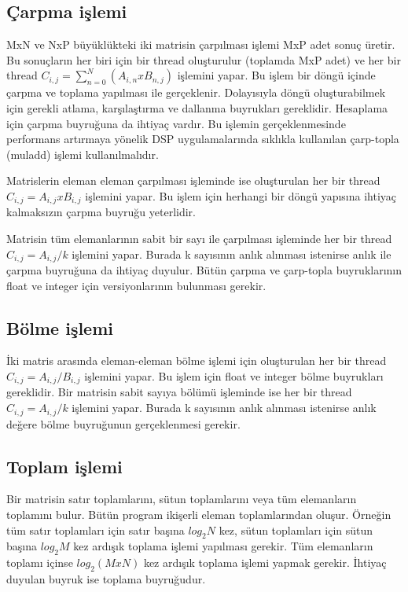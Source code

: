 \subsection{Çarpma işlemi}
MxN ve NxP büyüklükteki iki matrisin çarpılması işlemi MxP adet sonuç üretir. Bu sonuçların her biri için bir thread oluşturulur (toplamda MxP adet) ve her bir thread $C_{i,j} = \sum_{n=0}^{N} (A_{i,n} x B_{n,j})$ işlemini yapar. Bu işlem bir döngü içinde çarpma ve toplama yapılması ile gerçeklenir. Dolayısıyla döngü oluşturabilmek için gerekli atlama, karşılaştırma ve dallanma buyrukları gereklidir. Hesaplama için çarpma buyruğuna da ihtiyaç vardır. Bu işlemin gerçeklenmesinde performans artırmaya yönelik DSP uygulamalarında sıklıkla kullanılan çarp-topla (muladd) işlemi kullanılmalıdır.\par
Matrislerin eleman eleman çarpılması işleminde ise oluşturulan her bir thread $C_{i,j} = A_{i,j} x B_{i,j}$ işlemini yapar. Bu işlem için herhangi bir döngü yapısına ihtiyaç kalmaksızın çarpma buyruğu yeterlidir.\par
Matrisin tüm elemanlarının sabit bir sayı ile çarpılması işleminde her bir thread $C_{i,j} = A_{i,j} / k$ işlemini yapar. Burada k sayısının anlık alınması istenirse anlık ile çarpma buyruğuna da ihtiyaç duyulur.  Bütün çarpma ve çarp-topla buyruklarının float ve integer için versiyonlarının bulunması gerekir.

\subsection{Bölme işlemi}
İki matris arasında eleman-eleman bölme işlemi için oluşturulan her bir thread $C_{i,j} = A_{i,j} / B_{i,j}$ işlemini yapar. Bu işlem için float ve integer bölme buyrukları gereklidir. Bir matrisin sabit sayıya bölümü işleminde ise her bir thread $C_{i,j} = A_{i,j} / k$ işlemini yapar. Burada k sayısının anlık alınması istenirse anlık değere bölme buyruğunun gerçeklenmesi gerekir.

\subsection{Toplam işlemi}
Bir matrisin satır toplamlarını, sütun toplamlarını veya tüm elemanların toplamını bulur. Bütün program ikişerli eleman toplamlarından oluşur. Örneğin tüm satır toplamları için satır başına $log_{2}N$ kez, sütun toplamları için sütun başına $log_{2}M$ kez ardışık toplama işlemi yapılması gerekir. Tüm elemanların toplamı içinse $log_{2}(MxN)$ kez ardışık toplama işlemi yapmak gerekir. İhtiyaç duyulan buyruk ise toplama buyruğudur. 

